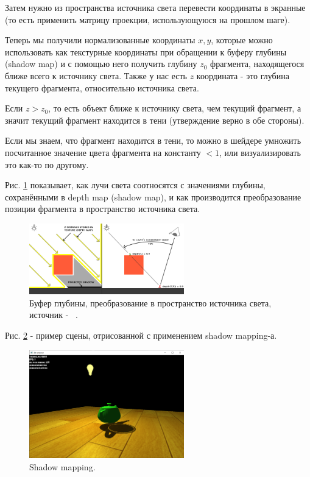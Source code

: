 \documentclass[14pt]{extarticle}
\begin{document}
Затем нужно из пространства источника света перевести координаты в экранные (то есть применить матрицу проекции, использующуюся на прошлом шаге). 

Теперь мы получили нормализованные координаты $x, y$, которые можно использовать как текстурные координаты при обращении к буферу глубины (shadow map) и с помощью него получить глубину $z_0$ фрагмента, находящегося ближе всего к источнику света. Также у нас есть $z$ координата - это глубина текущего фрагмента, относительно источника света. 

Если $z > z_0$, то есть объект ближе к источнику света, чем текущий фрагмент, а значит текущий фрагмент находится в тени (утверждение верно в обе стороны). 

Если мы знаем, что фрагмент находится в тени, то можно в шейдере умножить посчитанное значение цвета фрагмента на константу $<1$, или визуализировать это как-то по другому.

Рис. \ref{fig:shadow2} показывает, как лучи света соотносятся с значениями глубины, сохранёнными в depth map (shadow map), и как производится преобразование позиции фрагмента в пространство источника света.

\begin{figure}
	\label{fig:shadow2}
	\caption{Буфер глубины, преобразование в пространство источника света, источник - ~\cite{shadow2}.}
	\includegraphics[width=0.6\textwidth]{shadowmapping2.png}
\end{figure}

Рис. \ref{fig:shadow3} - пример сцены, отрисованной с применением shadow mapping-а.

\begin{figure}
	\label{fig:shadow3}
	\caption{Shadow mapping.}
	\includegraphics[width=0.6\textwidth]{shadows.png}
\end{figure}
\end{document}
